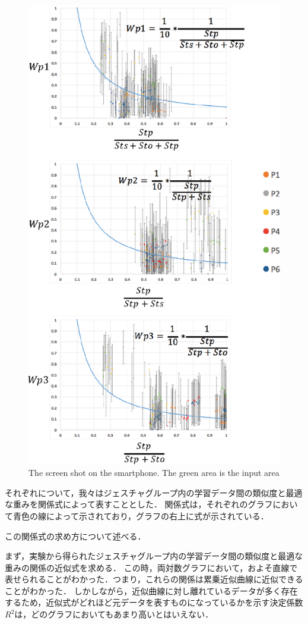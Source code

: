 \begin{figure}[!h]
\centering
\includegraphics[width=0.7\columnwidth]{img/weight_position.eps}
\caption{The screen shot on the smartphone. The green area is the input area}
\label{fig:weight_position}
\end{figure}

それぞれについて，我々はジェスチャグループ内の学習データ間の類似度と最適な重みを関係式によって表すこととした．
関係式は，それぞれのグラフにおいて青色の線によって示されており，グラフの右上に式が示されている．

この関係式の求め方について述べる．

まず，実験から得られたジェスチャグループ内の学習データ間の類似度と最適な重みの関係の近似式を求める．
この時，両対数グラフにおいて，およそ直線で表せられることがわかった．つまり，これらの関係は累乗近似曲線に近似できることがわかった．
しかしながら，近似曲線に対し離れているデータが多く存在するため，近似式がどれほど元データを表すものになっているかを示す決定係数$R^2$は，どのグラフにおいてもあまり高いとはいえない．

